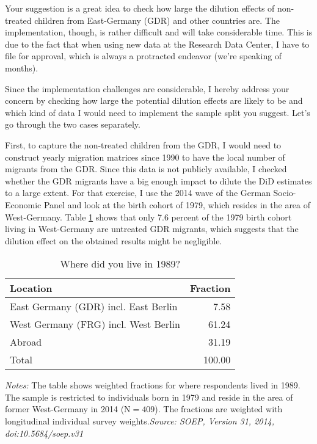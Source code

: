 Your suggestion is a great idea to check how large the dilution effects of non-treated children from East-Germany (GDR) and other countries are. The implementation, though, is rather difficult and will take considerable time. This is due to the fact that when using new data at the Research Data Center, I have to file for approval, which is always a protracted endeavor (we're speaking of months). 


Since the implementation challenges are considerable, I hereby address your concern by checking how large the potential dilution effects are likely to be and which kind of data I would need to implement the sample split you suggest. Let's go through the two cases separately. 

First, to capture the non-treated children from the GDR, I would need to construct yearly migration matrices since 1990 to have the local number of migrants from the GDR. Since this data is not publicly available, I checked whether the GDR migrants have a big enough impact to dilute the DiD estimates to a large extent. For that exercise, I use the 2014 wave of the German Socio-Economic Panel and look at the birth cohort of 1979, which resides in the area of West-Germany. Table \ref{rev_mlch: fractions_gdr_foreigners} shows that only 7.6 percent of the 1979 birth cohort living in West-Germany are untreated GDR migrants, which suggests that the dilution effect on the obtained results might be negligible. 


\begin{table}[H] \centering 
	\begin{threeparttable} \centering \caption{Where did you live in 1989?}\label{rev_mlch: fractions_gdr_foreigners}
		\begin{tabular}{lr}
			\toprule
			Location & Fraction \\
			\midrule
			
			East Germany (GDR) incl. East Berlin & 7.58 \\
			West Germany (FRG) incl. West Berlin & 61.24 \\
			Abroad & 31.19 \\
			\midrule
			Total & 100.00 \\
			\bottomrule
		\end{tabular}
		\begin{tablenotes} 
			\item \scriptsize \emph{Notes:} The table shows weighted fractions for where respondents lived in 1989. The sample is restricted to individuals born in 1979 and reside in the area of former West-Germany in 2014 (N$=409$). The fractions are weighted with longitudinal individual survey weights.\newline \emph{Source: SOEP, Version 31, 2014, doi:10.5684/soep.v31}
		\end{tablenotes}
	\end{threeparttable}
\end{table}

